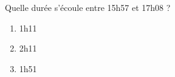
\begin{mental}
    
    Quelle durée s'écoule entre 15h57 et 17h08 ?
    \begin{enumerate}
        \item
            1h11
        \item
            2h11
        \item
            1h51
    \end{enumerate}

\end{mental}
